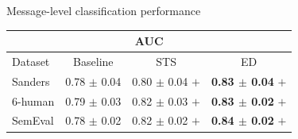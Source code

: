 \documentclass[handout]{beamer}
\begin{document}
\begin{frame}{Message-level classification performance}
\begin{scriptsize}
 \begin{table}[htbp]
\scriptsize
\begin{center}
\begin{tabular}{l|c|c|c}
\hline \hline
\multicolumn{ 4}{c}{AUC} \\ \hline \hline
Dataset & Baseline & STS & ED \\ \hline
Sanders & 0.78 $\pm$ 0.04 & 0.80 $\pm$ 0.04 $+$ & \textbf{0.83 $\pm$ 0.04} $+$ \\ 
6-human & 0.79 $\pm$ 0.03 & 0.82 $\pm$ 0.03 $+$ & \textbf{0.83 $\pm$ 0.02} $+$ \\ 
SemEval & 0.78 $\pm$ 0.02 & 0.82 $\pm$ 0.02 $+$ & \textbf{0.84 $\pm$ 0.02} $+$ \\ \hline
\end{tabular}
\end{center}
\end{table}
\end{scriptsize}
\end{frame}
\end{document}
